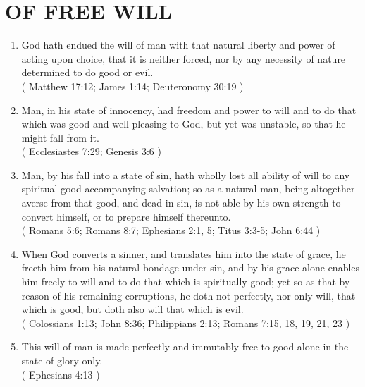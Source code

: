 \documentclass[12pt,a4paper]{book}
\begin{document}
\chapter{OF FREE WILL}
\label{ch-fre-wil}
\begin{enumerate}
\item God hath endued the will of man with that natural liberty and power of acting upon choice, that it is neither forced, nor by any necessity of nature determined to do good or evil.\\
( Matthew 17:12; James 1:14; Deuteronomy 30:19 )
\item Man, in his state of innocency, had freedom and power to will and to do that which was good and well-pleasing to God, but yet was unstable, so that he might fall from it.\\
( Ecclesiastes 7:29; Genesis 3:6 )
\item Man, by his fall into a state of sin, hath wholly lost all ability of will to any spiritual good accompanying salvation; so as a natural man, being altogether averse from that good, and dead in sin, is not able by his own strength to convert himself, or to prepare himself thereunto.\\
( Romans 5:6; Romans 8:7; Ephesians 2:1, 5; Titus 3:3-5; John 6:44 )
\item When God converts a sinner, and translates him into the state of grace, he freeth him from his natural bondage under sin, and by his grace alone enables him freely to will and to do that which is spiritually good; yet so as that by reason of his remaining corruptions, he doth not perfectly, nor only will, that which is good, but doth also will that which is evil.\\
( Colossians 1:13; John 8:36; Philippians 2:13; Romans 7:15, 18, 19, 21, 23 )
\item This will of man is made perfectly and immutably free to good alone in the state of glory only.\\
( Ephesians 4:13 )
\end{enumerate}
\end{document}
